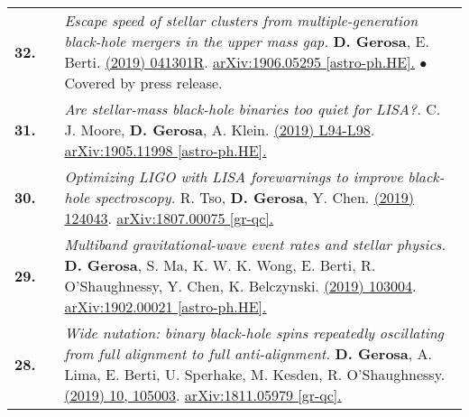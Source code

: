 {\begin{longtable}{rp{0.3cm}p{15.8cm}}
%
\textbf{32.} & & \textit{Escape speed of stellar clusters from multiple-generation black-hole mergers in the upper mass gap.}
\newline{}
\textbf{D. Gerosa}, E. Berti.
\newline{}
\href{https://journals.aps.org/prd/abstract/10.1103/PhysRevD.100.041301}{\prdrc 100 (2019) 041301R}. \href{https://arxiv.org/abs/1906.05295}{arXiv:1906.05295 [astro-ph.HE].}
\newline{}
\textcolor{color1}{$\bullet$} Covered by press release.
\vspace{0.09cm}\\
%
\textbf{31.} & & \textit{Are stellar-mass black-hole binaries too quiet for LISA?.}
\newline{}
C. J. Moore, \textbf{D. Gerosa}, A. Klein.
\newline{}
\href{https://doi.org/10.1093/mnrasl/slz104}{\mnrasl 488 (2019) L94-L98}. \href{https://arxiv.org/abs/1905.11998}{arXiv:1905.11998 [astro-ph.HE].}
\vspace{0.09cm}\\
%
\textbf{30.} & & \textit{Optimizing LIGO with LISA forewarnings to improve black-hole spectroscopy.}
\newline{}
R. Tso, \textbf{D. Gerosa}, Y. Chen.
\newline{}
\href{https://journals.aps.org/prd/abstract/10.1103/PhysRevD.99.124043}{\prd 99 (2019) 124043}. \href{https://arxiv.org/abs/1807.00075}{arXiv:1807.00075 [gr-qc].}
\vspace{0.09cm}\\
%
\textbf{29.} & & \textit{Multiband gravitational-wave event rates and stellar physics.}
\newline{}
\textbf{D. Gerosa}, S. Ma, K. W. K. Wong, E. Berti, R. O'Shaughnessy, Y. Chen, K. Belczynski.
\newline{}
\href{https://journals.aps.org/prd/abstract/10.1103/PhysRevD.99.103004}{\prd 99 (2019) 103004}. \href{https://arxiv.org/abs/1902.00021}{arXiv:1902.00021 [astro-ph.HE].}
\vspace{0.09cm}\\
%
\textbf{28.} & & \textit{Wide nutation: binary black-hole spins repeatedly oscillating from full alignment to full anti-alignment.}
\newline{}
\textbf{D. Gerosa}, A. Lima, E. Berti, U. Sperhake, M. Kesden, R. O'Shaughnessy.
\newline{}
\href{https://iopscience.iop.org/article/10.1088/1361-6382/ab14ae/meta}{\cqg 36 (2019) 10, 105003}. \href{https://arxiv.org/abs/1811.05979}{arXiv:1811.05979 [gr-qc].}

\end{longtable}}
